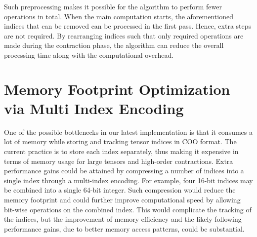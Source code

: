 \noindent
Such preprocessing makes it possible for the algorithm to perform fewer operations in total.
When the main computation starts, the aforementioned indices that can be removed can be
processed in the first pass. Hence, extra steps are not required. By rearranging indices
such that only required operations are made during the contraction phase, the algorithm can
reduce the overall processing time along with the computational overhead.

\section{Memory Footprint Optimization via Multi Index Encoding}
One of the possible bottlenecks in our latest implementation is that it consumes a lot of
memory while storing and tracking tensor indices in COO format. The current practice is to
store each index separately, thus making it expensive in terms of memory usage for large
tensors and high-order contractions. Extra performance gains could be attained by compressing
a number of indices into a single index through a multi-index encoding. For example, four
16-bit indices may be combined into a single 64-bit integer. Such compression would reduce
the memory footprint and could further improve computational speed by allowing bit-wise
operations on the combined index. This would complicate the tracking of the indices, but the
improvement of memory efficiency and the likely following performance gains, due to better
memory access patterns, could be substantial.